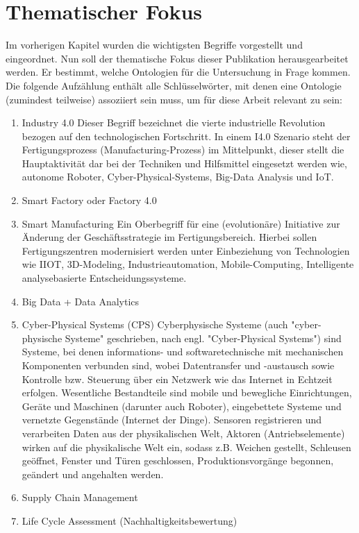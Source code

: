 \documentclass{article}
\begin{document}
\section{Thematischer Fokus}

Im vorherigen Kapitel wurden die wichtigsten Begriffe vorgestellt und eingeordnet.
Nun soll der thematische Fokus dieser Publikation herausgearbeitet werden.
Er bestimmt, welche Ontologien für die Untersuchung in Frage kommen.
Die folgende Aufzählung enthält alle Schlüsselwörter, mit denen eine Ontologie (zumindest teilweise) assoziiert sein muss, um für diese Arbeit relevant zu sein:

\begin{enumerate}
    \item Industry 4.0
    Dieser Begriff bezeichnet die vierte industrielle Revolution bezogen auf den technologischen Fortschritt. In einem I4.0 Szenario steht der Fertigungsprozess (Manufacturing-Prozess) im Mittelpunkt, dieser stellt die Hauptaktivität dar bei der Techniken und Hilfsmittel eingesetzt werden wie, autonome Roboter, Cyber-Physical-Systems, Big-Data Analysis und IoT. 
    \item Smart Factory oder Factory 4.0
    \item Smart Manufacturing
    Ein Oberbegriff für eine (evolutionäre) Initiative zur Änderung der Geschäftsstrategie im Fertigungsbereich. Hierbei sollen Fertigungszentren modernisiert werden unter Einbeziehung von Technologien wie IIOT, 3D-Modeling, Industrieautomation, Mobile-Computing, Intelligente analysebasierte Entscheidungssysteme.
    \item Big Data + Data Analytics
    \item Cyber-Physical Systems (CPS)
    Cyberphysische Systeme (auch "cyber-physische Systeme" geschrieben, nach engl. "Cyber-Physical Systems") sind Systeme, bei denen informations- und softwaretechnische mit mechanischen Komponenten verbunden sind, wobei Datentransfer und -austausch sowie Kontrolle bzw. Steuerung über ein Netzwerk wie das Internet in Echtzeit erfolgen. Wesentliche Bestandteile sind mobile und bewegliche Einrichtungen, Geräte und Maschinen (darunter auch Roboter), eingebettete Systeme und vernetzte Gegenstände (Internet der Dinge). Sensoren registrieren und verarbeiten Daten aus der physikalischen Welt, Aktoren (Antriebselemente) wirken auf die physikalische Welt ein, sodass z.B. Weichen gestellt, Schleusen geöffnet, Fenster und Türen geschlossen, Produktionsvorgänge begonnen, geändert und angehalten werden.\cite{GablerCPS2024}
    
    \item Supply Chain Management
    \item Life Cycle Assessment (Nachhaltigkeitsbewertung)
\end{enumerate}
\end{document}
